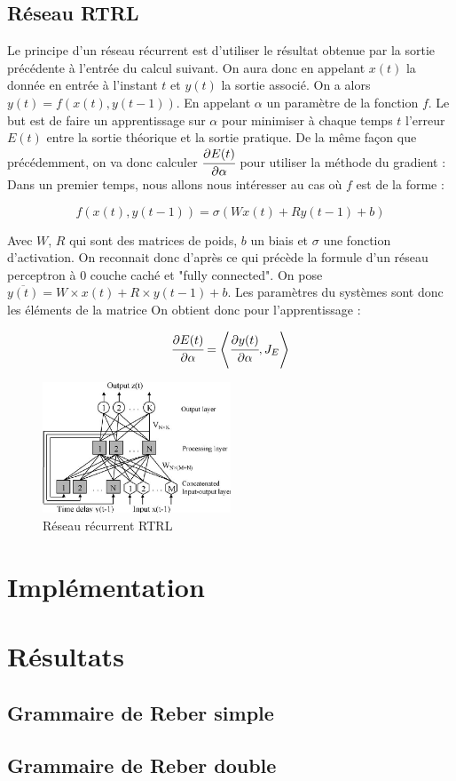 \subsection{Réseau RTRL}

Le principe d'un réseau récurrent est d'utiliser le résultat obtenue par la sortie précédente à l'entrée du calcul suivant.
On aura donc en appelant $x(t)$ la donnée en entrée à l'instant $t$ et $y(t)$ la sortie associé.
On a alors $y(t) = f(x(t), y(t-1))$.
En appelant $\alpha$ un paramètre de la fonction $f$.
Le but est de faire un apprentissage sur $\alpha$ pour minimiser à chaque temps $t$ l'erreur $E(t)$ entre la sortie théorique et la sortie pratique.
De la même façon que précédemment, on va donc calculer $\cfrac{\partial E(t)}{\partial \alpha}$ pour utiliser la méthode du gradient :
Dans un premier temps, nous allons nous intéresser au cas où $f$ est de la forme :

\[ f(x(t), y(t-1)) = \sigma\left (W x(t) + R y(t-1) + b\right )\]

Avec $W$, $R$ qui sont des matrices de poids, $b$ un biais et $\sigma$ une fonction d'activation.
On reconnait donc d'après ce qui précède la formule d'un réseau perceptron à $0$ couche caché et "fully connected".
On pose $\overline{y(t)} = W\times x(t) + R\times y(t-1) + b$.
Les paramètres du systèmes sont donc les éléments de la matrice
On obtient donc pour l'apprentissage :

\[\cfrac{\partial E(t)}{\partial \alpha} = \left\langle \cfrac{\partial y(t)}{\partial \alpha}, J_E \right\rangle\]

\begin{figure}[!ht]
\begin{center}
  \includegraphics[width=0.5\textwidth]{images/rtrl.png}
\end{center}
\caption{Réseau récurrent RTRL}
\end{figure}

\section{Implémentation}

\section{Résultats}
\subsection{Grammaire de Reber simple}
\subsection{Grammaire de Reber double}
